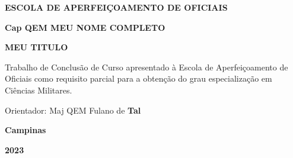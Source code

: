 \documentclass[12pt,a4paper]{article}
\def\mytitle{MEU TITULO}
\def\myname{Cap QEM MEU NOME COMPLETO}
\def\myadvisor{Maj QEM Fulano de \textbf{Tal}}
\begin{document}
\begin{titlepage}
    \centering
    \onehalfspacing
    \textbf{\Large ESCOLA DE APERFEIÇOAMENTO DE OFICIAIS} %
    
    \vspace{3\baselineskip} %

    \textbf{\myname} %

    \vspace{4\baselineskip} %

    \textbf{\mytitle} %

    \vspace{2\baselineskip} %


    \vspace{\baselineskip} %


    \vspace{4\baselineskip} %

    \begin{flushright}
    \begin{minipage}{0.5\textwidth}
        \singlespacing
        Trabalho de Conclusão de Curso apresentado à Escola de  Aperfeiçoamento de Oficiais como requisito parcial para a obtenção do grau especialização em Ciências Militares.

        \vspace{\baselineskip} %

         Orientador: \myadvisor %
    \end{minipage}
    \end{flushright}

    \vfill %

    \vspace{4cm} %

    \onehalfspacing
    \textbf{Campinas} %

    \vspace{\baselineskip} %

    \textbf{2023} %
\end{titlepage}

\end{document}
